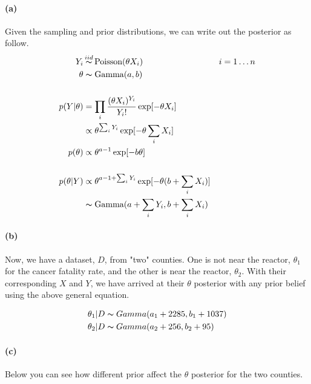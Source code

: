 \documentclass[11pt, letterpaper]{article}
\begin{document}
\paragraph{(a)}
Given the sampling and prior distributions, we can write out the posterior as follow.
\begin{align*}
    Y_i &\mathop{\thicksim}^{iid} \text{Poisson}(\theta X_i) && i = 1 \dots n \\
    \theta &\thicksim \text{Gamma}(a, b) \\ \\
    p(Y|\theta) &= \prod_i \frac{(\theta X_i)^{Y_i}}{Y_i !} \exp[-\theta X_i] \\
        &\propto \theta^{\sum_i Y_i} \exp[-\theta \sum_i X_i] \\
    p(\theta) &\propto \theta^{a-1} \exp[-b\theta] \\ \\
    p(\theta|Y) &\propto \theta^{a - 1 + \sum_i Y_i} \exp[-\theta(b+\sum_i X_i)] \\
        &\thicksim \text{Gamma}(a + \sum_i Y_i, b+\sum_i X_i)
\end{align*}

\paragraph{(b)}
Now, we have a dataset, $D$, from "two" counties. One is not near the reactor, $\theta_1$ for the cancer fatality rate, and the other is near the reactor, $\theta_2$. With their corresponding $X$ and $Y$, we have arrived at their $\theta$ posterior with any prior belief using the above general equation.

\begin{align*}
    \theta_1|D &\thicksim Gamma(a_1 + 2285, b_1 + 1037) \\
    \theta_2|D &\thicksim Gamma(a_2 + 256, b_2 + 95)
\end{align*}

\paragraph{(c)}
Below you can see how different prior affect the $\theta$ posterior for the two counties.
\end{document}
